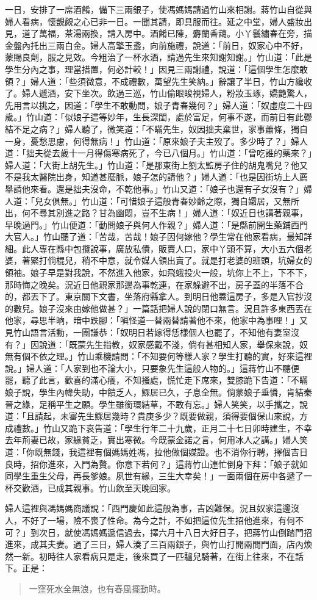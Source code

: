 一日，安排了一席酒餚，備下三兩銀子，使馮媽媽請過竹山來相謝。蔣竹山自從與婦人看病，懷覬覦之心已非一日。一聞其請，即具服而往。延之中堂，婦人盛妝出見，道了萬福，茶湯兩換，請入房中。酒餚已陳，麝蘭香藹。小丫鬟繡春在旁，描金盤內托出三兩白金。婦人高擎玉盞，向前施禮，說道：「前日，奴家心中不好，蒙賜良劑，服之見效。今粗治了一杯水酒，請過先生來知謝知謝。」竹山道：「此是學生分內之事，理當措置，何必計較！」因見三兩謝禮，說道：「這個學生怎麼敢領？」婦人道：「些須微意，不成禮數，萬望先生笑納。」辭讓了半日，竹山方纔收了。婦人遞酒，安下坐次。飲過三巡，竹山偷眼睃視婦人，粉妝玉琢，嬌艷驚人，先用言以挑之，因道：「學生不敢動問，娘子青春幾何？」婦人道：「奴虛度二十四歲。」竹山道：「似娘子這等妙年，生長深閨，處於富足，何事不遂，而前日有此鬱結不足之病？」婦人聽了，微笑道：「不瞞先生，奴因拙夫棄世，家事蕭條，獨自一身，憂愁思慮，何得無病！」竹山道：「原來娘子夫主歿了。多少時了？」婦人道：「拙夫從去歲十一月得傷寒病死了，今已八個月。」竹山道：「曾吃誰的藥來？」婦人道：「大街上胡先生。」竹山道：「是那東街上劉太監房子住的胡鬼嘴兒？他又不是我太醫院出身，知道甚麼脈，娘子怎的請他？」婦人道：「也是因街坊上人薦舉請他來看。還是拙夫沒命，不乾他事。」竹山又道：「娘子也還有子女沒有？」婦人道：「兒女俱無。」竹山道：「可惜娘子這般青春妙齡之際，獨自孀居，又無所出，何不尋其別進之路？甘為幽悶，豈不生病！」婦人道：「奴近日也講著親事，早晚過門。」竹山便道：「動問娘子與何人作親？」婦人道：「是縣前開生藥鋪西門大官人。」竹山聽了道：「苦哉，苦哉！娘子因何嫁他？學生常在他家看病，最知詳細。此人專在縣中包攬說事，廣放私債，販賣人口，家中丫頭不算，大小五六個老婆，著緊打倘棍兒，稍不中意，就令媒人領出賣了。就是打老婆的班頭，坑婦女的領袖。娘子早是對我說，不然進入他家，如飛蛾投火一般，坑你上不上，下不下，那時悔之晚矣。況近日他親家那邊為事乾連，在家躲避不出，房子蓋的半落不合的，都丟下了。東京關下文書，坐落府縣拿人。到明日他蓋這房子，多是入官抄沒的數兒。娘子沒來由嫁他做甚？」一篇話把婦人說的閉口無言。況且許多東西丟在他家，尋思半晌，暗中跌腳：「嗔怪道一替兩替請著他不來，他家中為事哩！」又見竹山語言活動，一團謙恭：「奴明日若嫁得恁樣個人也罷了，不知他有妻室沒有？」因說道：「既蒙先生指教，奴家感戴不淺，倘有甚相知人家，舉保來說，奴無有個不依之理。」竹山乘機請問：「不知要何等樣人家？學生打聽的實，好來這裡說。」婦人道：「人家到也不論大小，只要象先生這般人物的。」這蔣竹山不聽便罷，聽了此言，歡喜的滿心癢，不知搔處，慌忙走下席來，雙膝跪下告道：「不瞞娘子說，學生內幃失助，中饋乏人，鰥居已久，子息全無。倘蒙娘子垂憐，肯結秦晉之緣，足稱平生之願。學生雖銜環結草，不敢有忘。」婦人笑笑，以手攜之，說道：「且請起，未審先生鰥居幾時？貴庚多少？既要做親，須得要個保山來說，方成禮數。」竹山又跪下哀告道：「學生行年二十九歲，正月二十七日卯時建生，不幸去年荊妻已故，家緣貧乏，實出寒微。今既蒙金諾之言，何用冰人之講。」婦人笑道：「你既無錢，我這裡有個媽媽姓馮，拉他做個媒證。也不消你行聘，擇個吉日良時，招你進來，入門為贅。你意下若何？」這蔣竹山連忙倒身下拜：「娘子就如同學生重生父母，再長爹娘。夙世有緣，三生大幸矣！」一面兩個在房中各遞了一杯交歡酒，已成其親事。竹山飲至天晚回家。

婦人這裡與馮媽媽商議說：「西門慶如此這般為事，吉凶難保。況且奴家這邊沒人，不好了一場，險不喪了性命。為今之計，不如把這位先生招他進來，有何不可？」到次日，就使馮媽媽遞信過去，擇六月十八日大好日子，把蔣竹山倒踏門招進來，成其夫妻。過了三日，婦人湊了三百兩銀子，與竹山打開兩間門面，店內煥然一新。初時往人家看病只是走，後來買了一匹驢兒騎著，在街上往來，不在話下。正是：
\begin{quote}
一窪死水全無浪，也有春風擺動時。
\end{quote}
